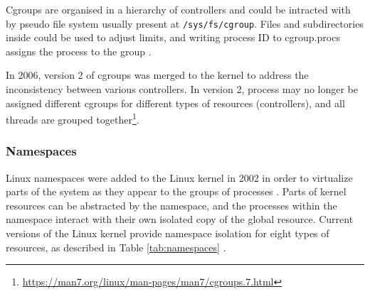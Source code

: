 Cgroups are organised in a hierarchy of controllers and could be intracted with by pseudo file system usually present at \texttt{/sys/fs/cgroup}. Files and subdirectories inside could be used to adjust limits, and writing process ID to cgroup.procs assigns the process to the group \cite{book:rice}.

In 2006, version 2 of cgroups was merged to the kernel to address the inconsistency between various controllers. In version 2, process may no longer be assigned different cgroups for different types of resources (controllers), and all threads are grouped together\footnote{\url{https://man7.org/linux/man-pages/man7/cgroups.7.html}}.

\subsubsection{Namespaces}

Linux namespaces were added to the Linux kernel in 2002 in order to virtualize parts of the system as they appear to the groups of processes \cite{m:namespaces}. Parts of kernel resources can be abstracted by the namespace, and the processes within the namespace interact with their own isolated copy of the global resource. Current versions of the Linux kernel provide namespace isolation for eight types of resources, as described in Table \ref{tab:namespaces} \cite{s:namespaces}.


